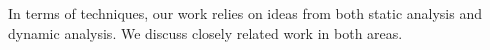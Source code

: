 In terms of techniques, our work relies on ideas from both static analysis and dynamic analysis. 
We discuss closely related work in both areas.

